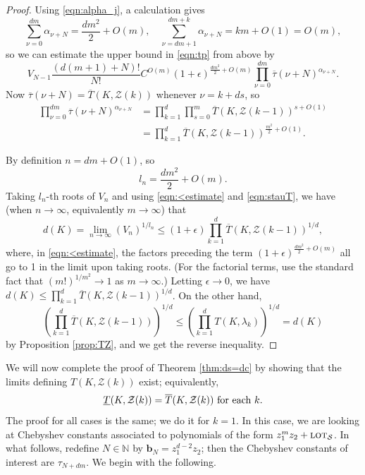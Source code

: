 \documentclass[12pt]{article}
\numberwithin{equation}{section}
\newcommand{\N}{\mathbb{N}}
\newcommand{\stau}{\overline\tau}
\newcommand{\lot}{\text{\sc lot}}
\newcommand{\calZ}{\mathcal{Z}}
\newcommand{\calS}{\mathcal{S}}
\newcommand{\bb}{\mathbf{b}}
\begin{document}
\begin{proof}
Using \eqref{eqn:alpha_j}, a calculation gives
$$
\sum_{\nu=0}^{dm} \alpha_{\nu+N} = \frac{dm^2}{2} + O(m),\quad  
\sum_{\nu=dm+1}^{dm+k} \alpha_{\nu+N} = km+O(1) = O(m),
$$
 so we can estimate the upper bound in \eqref{eqn:tp} from above by   
\begin{equation}\label{eqn:<estimate}V_{N-1} \frac{(d(m+1)+N)!}{N!}C^{O(m)}(1+\epsilon)^{\frac{dm^2}{2} + O(m)} \prod_{\nu=0}^{dm} \stau(\nu+N)^{\alpha_{\nu+N}}.\end{equation}
Now $\stau(\nu+N) = \overline T(K,\calZ(k))$ whenever $\nu = k+ds$, so 
\begin{equation}\label{eqn:stauT}\begin{aligned}
\prod_{\nu=0}^{dm} \stau(\nu+N)^{\alpha_{\nu+N}} &= \prod_{k=1}^d\prod_{s=0}^m \overline T(K,\calZ(k-1))^{s+O(1)} \\
& = \prod_{k=1}^d \overline T(K,\calZ(k-1))^{\frac{m^2}{2}+O(1)}.
\end{aligned}\end{equation}

By definition $n=dm+O(1)$, so 
\begin{equation}\label{eqn:ln} l_n=\frac{dm^2}{2}+O(m).\end{equation}
  Taking $l_n$-th roots of $V_n$ and using \eqref{eqn:<estimate} and  \eqref{eqn:stauT}, we have (when $n\to\infty$,  equivalently $m\to\infty$) that 
$$
d(K) = \lim_{n\to\infty} (V_n)^{1/l_n}\leq (1+\epsilon) \prod_{k=1}^d\overline T(K,\calZ(k-1))^{1/d}, 
$$
where, in \eqref{eqn:<estimate}, the factors preceding the term $(1+\epsilon)^{\frac{dm^2}{2} + O(m)}$ all go to 1 in the limit upon taking roots.    (For the factorial terms, use the standard fact that $(m!)^{1/m^2}\to 1$ as $m\to\infty$.)  Letting $\epsilon\to 0$, we have $d(K)\leq \prod_{k=1}^d\overline T(K,\calZ(k-1))^{1/d}$.   On the other hand,
$$
\left(\prod_{k=1}^d\overline T(K,\calZ(k-1))\right)^{1/d}\leq \left(\prod_{k=1}^d T(K,\lambda_k)\right)^{1/d} =d(K)
$$
by Proposition \ref{prop:TZ}, and we get the reverse inequality.  
\end{proof}


We will now complete the proof of Theorem \ref{thm:ds=dc} by showing that the limits defining $T(K,\calZ(k))$ exist; equivalently,  
$$\underline T(K,\calZ(k))=\overline T(K,\calZ(k)) \hbox{ for each }k. $$
The proof for all cases is the same; we do it for $k=1$.   In this case, we are looking at Chebyshev constants associated to polynomials of the form $z_1^mz_2+\lot_{\calS}$.    
In what follows, redefine $N\in\N$ by $\bb_N=z_1^{d-2}z_2$; then the Chebyshev constants of interest are $\tau_{N+dm}$. We begin with the following.
\end{document}
